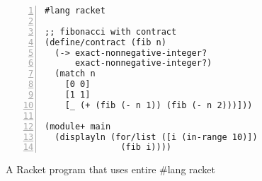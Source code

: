 \begin{figure}[!htbp]
\centering
\begin{minipage}{0.6\textwidth}
\begin{lstlisting}[language=racket,
                basicstyle=\ttfamily\footnotesize,
                numbers=left, xleftmargin=2em]
#lang racket

;; fibonacci with contract
(define/contract (fib n)
  (-> exact-nonnegative-integer?
      exact-nonnegative-integer?)
  (match n
    [0 0]
    [1 1]
    [_ (+ (fib (- n 1)) (fib (- n 2)))]))

(module+ main
  (displayln (for/list ([i (in-range 10)])
               (fib i))))
\end{lstlisting}
\end{minipage}
\caption{A Racket program that uses entire \#lang racket}
\label{fig:racket-contract-example}
\end{figure}
